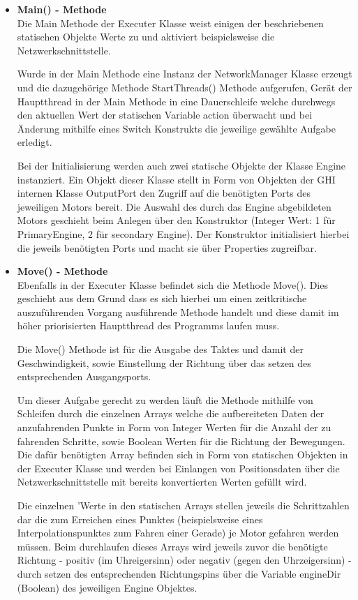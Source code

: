 \begin{itemize}
\item \textbf{Main() - Methode}\\
Die Main Methode der Executer Klasse weist einigen der beschriebenen statischen Objekte Werte zu und aktiviert beispielsweise die Netzwerkschnittstelle.

Wurde in der Main Methode eine Instanz der NetworkManager Klasse erzeugt und die dazugehörige Methode StartThreads() Methode aufgerufen, Gerät der Hauptthread in der Main Methode in eine Dauerschleife welche durchwegs den aktuellen Wert der statischen Variable action überwacht und bei Änderung mithilfe eines Switch Konstrukts die jeweilige gewählte Aufgabe erledigt.

Bei der Initialisierung werden auch zwei statische Objekte der Klasse Engine instanziert. Ein Objekt dieser Klasse stellt in Form von Objekten der GHI internen Klasse OutputPort den Zugriff auf die benötigten Ports des jeweiligen Motors bereit. Die Auswahl des durch das Engine abgebildeten Motors geschieht beim Anlegen über den Konstruktor (Integer Wert: 1 für PrimaryEngine, 2 für secondary Engine). Der Konstruktor initialisiert hierbei die jeweils benötigten Ports und macht sie über Properties zugreifbar.

\item \textbf{Move() - Methode}\\

Ebenfalls in der Executer Klasse befindet sich die Methode Move(). Dies geschieht aus dem Grund dass es sich hierbei um einen zeitkritische auszuführenden Vorgang ausführende Methode handelt und diese damit im höher priorisierten Hauptthread des Programms laufen muss.

Die Move()  Methode ist für die Ausgabe des Taktes und damit der Geschwindigkeit, sowie Einstellung der Richtung über das setzen des entsprechenden Ausgangsports.

Um dieser Aufgabe gerecht zu werden läuft die Methode mithilfe von Schleifen durch die einzelnen Arrays welche die aufbereiteten Daten der anzufahrenden Punkte in Form von Integer Werten für die Anzahl der zu fahrenden Schritte, sowie Boolean Werten für die Richtung der Bewegungen.
Die dafür benötigten Array befinden sich in Form von statischen Objekten in der Executer Klasse und werden bei Einlangen von Positionsdaten über die Netzwerkschnittstelle mit bereits konvertierten Werten gefüllt wird.

Die einzelnen 'Werte in den statischen Arrays stellen jeweils die Schrittzahlen dar die zum Erreichen eines Punktes (beispielsweise eines Interpolationspunktes zum Fahren einer Gerade) je Motor gefahren werden müssen. Beim durchlaufen dieses Arrays wird jeweils zuvor die benötigte Richtung - positiv (im Uhreigersinn) oder negativ (gegen den Uhrzeigersinn) - durch setzen des entsprechenden Richtungspins über die Variable engineDir (Boolean) des jeweiligen Engine Objektes.


\end{itemize}
